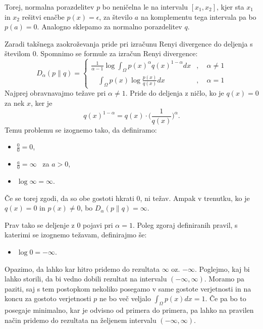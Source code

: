 Torej, normalna porazdelitev $p$ bo neničelna le na intervalu $[x_1, x_2]$, kjer sta $x_1$ in $x_2$ rešitvi enačbe $p(x) = \epsilon$, za število $a$ na komplementu tega intervala pa bo $p(a)=0$. Analogno sklepamo za normalno porazdelitev $q$.

Zaradi takšnega zaokroževanja pride pri izračunu Renyi divergence do deljenja s številom 0. Spomnimo se formule za izračun Renyi divergence:
\begin{equation}
D_\alpha(p \| q) =
\begin{cases}
    \frac{1}{\alpha-1} \log \int_{\Omega} p(x)^{\alpha}q(x)^{1-\alpha}  dx&, \quad \alpha \neq 1 \\
    \quad \int_{\Omega} p(x) \log \frac{p(x)}{q(x)} dx&, \quad \alpha = 1
\end{cases}
\end{equation}
Najprej obravnavajmo težave pri $\alpha \neq 1$. Pride do deljenja z ničlo, ko je $q(x) = 0$ za nek $x$, ker je 
\begin{equation}
    q(x)^{1-\alpha} = q(x)\cdot\Big(\frac{1}{q(x)}\Big)^\alpha.
\end{equation}
Temu problemu se izognemo tako, da definiramo:
\begin{itemize}
    \item $\frac{0}{0}=0$,
	\item $\frac{a}{0}=\infty$ \ za $a>0$,
	\item $\log\infty = \infty$.
\end{itemize}
Če se torej zgodi, da so obe gostoti hkrati 0, ni težav. Ampak v trenutku, ko je $q(x) = 0$ in $p(x) \neq 0$, bo $D_\alpha(p \| q) = \infty$.

Prav tako se deljenje z 0 pojavi pri $\alpha = 1$. Poleg zgoraj definiranih pravil, s katerimi se izognemo težavam, definirajmo še:
\begin{itemize}
    \item $\log 0 = -\infty$.
\end{itemize}

Opazimo, da lahko kar hitro pridemo do rezultata $\infty$ oz. $-\infty$. Poglejmo, kaj bi lahko storili, da bi vedno dobili rezultat na intervalu $(-\infty, \infty)$. Moramo pa paziti, saj s tem postopkom nekoliko posegamo v same gostote verjetnosti in na koncu za gostoto verjetnosti $p$ ne bo več veljalo $\int_\Omega p(x) dx = 1$. Če pa bo to posegaje minimalno, kar je odvisno od primera do primera, pa lahko na pravilen način pridemo do rezultata na željenem intervalu $(-\infty, \infty)$.

